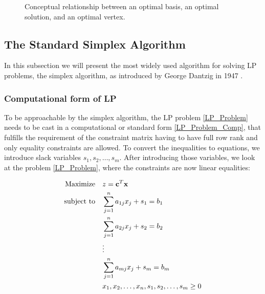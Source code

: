 \begin{figure}[!htb]
    \centering
    \caption{Conceptual relationship between an optimal basis, an optimal solution,
        and an optimal vertex.}
\end{figure} \label{equivalence_terms}

\subsection{The Standard Simplex Algorithm}

In this subsection we will present the most widely used algorithm for solving LP problems, the simplex algorithm, as introduced by George Dantzig in 1947 \parencite{dantzig1990origins}.

\subsubsection{Computational form of LP}

To be approachable by the simplex algorithm, the LP problem \ref{LP_Problem} needs to be cast in a computational or standard form \ref{LP_Problem_Comp}, that fulfills the requirement of the constraint matrix having to have full row rank and only equality constraints are allowed. To convert the inequalities to equations, we introduce slack variables \(s_1, s_2, \dots, s_m\). After introducing those variables, we look at the problem \ref{LP_Problem}, where the constraints are now linear equalities:

\begin{align}
    \text{Maximize} \quad   & z = \mathbf{c}^T \mathbf{x} \notag                            \\
    \text{subject to} \quad & \sum_{j=1}^{n} a_{1j} x_j + s_1 = b_1 \notag                  \\
                            & \sum_{j=1}^{n} a_{2j} x_j + s_2 = b_2 \notag                  \\
                            & \vdots \notag                                                 \\
                            & \sum_{j=1}^{n} a_{mj} x_j + s_m = b_m \label{LP_Problem_Comp} \\
                            & x_1, x_2, \dots, x_n, s_1, s_2, \dots, s_m \geq 0 \notag
\end{align}

